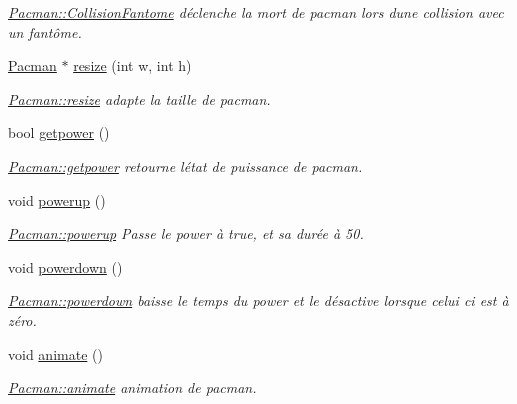 \begin{DoxyCompactItemize}
\begin{DoxyCompactList}\small\item\em \hyperlink{class_pacman_a5945a47618f294f298dfda06c4ef1094}{Pacman\+::\+Collision\+Fantome} déclenche la mort de pacman lors d\textquotesingle{}une collision avec un fantôme. \end{DoxyCompactList}\item 
\hyperlink{class_pacman}{Pacman} $\ast$ \hyperlink{class_pacman_adc9142f8bd016165ddd5ed42ab34f54f}{resize} (int w, int h)
\begin{DoxyCompactList}\small\item\em \hyperlink{class_pacman_adc9142f8bd016165ddd5ed42ab34f54f}{Pacman\+::resize} adapte la taille de pacman. \end{DoxyCompactList}\item 
bool \hyperlink{class_pacman_a18dcf6d973a44258d1458aeab3f32d82}{getpower} ()
\begin{DoxyCompactList}\small\item\em \hyperlink{class_pacman_a18dcf6d973a44258d1458aeab3f32d82}{Pacman\+::getpower} retourne l\textquotesingle{}état de puissance de pacman. \end{DoxyCompactList}\item 
\hypertarget{class_pacman_a37bbcb76068907e354e496d736d1ea86}{}void \hyperlink{class_pacman_a37bbcb76068907e354e496d736d1ea86}{powerup} ()\label{class_pacman_a37bbcb76068907e354e496d736d1ea86}

\begin{DoxyCompactList}\small\item\em \hyperlink{class_pacman_a37bbcb76068907e354e496d736d1ea86}{Pacman\+::powerup} Passe le power à true, et sa durée à 50. \end{DoxyCompactList}\item 
\hypertarget{class_pacman_a1f1d1c5db46a3717fe313cab27ae5d20}{}void \hyperlink{class_pacman_a1f1d1c5db46a3717fe313cab27ae5d20}{powerdown} ()\label{class_pacman_a1f1d1c5db46a3717fe313cab27ae5d20}

\begin{DoxyCompactList}\small\item\em \hyperlink{class_pacman_a1f1d1c5db46a3717fe313cab27ae5d20}{Pacman\+::powerdown} baisse le temps du power et le désactive lorsque celui ci est à zéro. \end{DoxyCompactList}\item 
\hypertarget{class_pacman_abed309f6ec8bccb77c5c5fabb8d20ee5}{}void \hyperlink{class_pacman_abed309f6ec8bccb77c5c5fabb8d20ee5}{animate} ()\label{class_pacman_abed309f6ec8bccb77c5c5fabb8d20ee5}

\begin{DoxyCompactList}\small\item\em \hyperlink{class_pacman_abed309f6ec8bccb77c5c5fabb8d20ee5}{Pacman\+::animate} animation de pacman. \end{DoxyCompactList}\end{DoxyCompactItemize}
